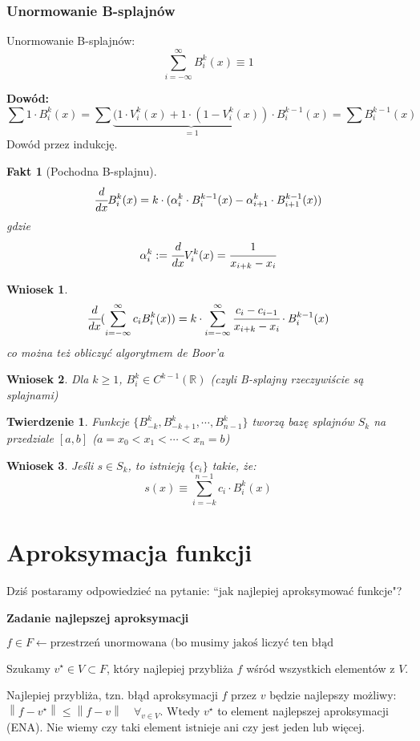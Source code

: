 \documentclass[hidelinks,a4paper,fleqn,oneside]{book}
\newcommand{\RR}{\mathbb{R}}
\newcommand{\la}{\leftarrow}
\newcommand{\norm}[1]{\left\lVert#1\right\rVert}
\newtheorem{wniosek}{Wniosek}
\newtheorem{fakt}{Fakt}
\newtheorem{twierdz}{Twierdzenie}
\begin{document}
\subsubsection{Unormowanie B-splajnów}
Unormowanie B-splajnów: 
\[
	\sum_{i=-\infty}^{\infty} B_i^k(x) \equiv 1
\]

\textbf{Dowód:}
\[
\sum 1 \cdot B_i^k(x) = \sum \underbrace{(1 \cdot V_i^k(x) + 1 \cdot (1-V_i^k(x))}_{=1} \cdot B_i^{k-1}(x) = \sum B_i^{k-1}(x)
\]
Dowód przez indukcję.

\begin{fakt}[Pochodna B-splajnu]
	\[
		\cfrac{d}{dx} B_i^k(x) = k \cdot (\alpha_i^k \cdot B_i^{k-1}(x) - \alpha_{i+1}^k \cdot B_{i+1}^{k-1}(x))
	\]
	gdzie
	\[
		\alpha_i^k := \cfrac{d}{dx}V_i^k(x) = \cfrac{1}{x_{i+k} - x_i}
	\]
\end{fakt}
\begin{wniosek}
	\[
		\cfrac{d}{dx}(\sum_{i=-\infty}^{\infty} c_i B_i^k(x)) = k \cdot \sum_{i=-\infty}^{\infty} \cfrac{c_i - c_{i-1}}{x_{i+k}-x_i} \cdot B_i^{k-1}(x)
	\]
	co można też obliczyć algorytmem de Boor'a
\end{wniosek}
\begin{wniosek}
	Dla $k \geq 1$, $B_i^k \in C^{k-1}(\RR)$ (czyli B-splajny rzeczywiście są splajnami)
\end{wniosek}

\begin{twierdz}
	Funkcje $\{B_{-k}^k, B_{-k+1}^k, \cdots, B_{n-1}^{k}\}$ tworzą bazę splajnów $S_k$ na przedziale $[a, b]$ ($a = x_0 < x_1 < \cdots < x_n = b$)
\end{twierdz}
\begin{wniosek}
	Jeśli $s \in S_k$, to istnieją $\{c_i\}$ takie, że:
	\[
		s(x) \equiv \sum_{i=-k}^{n-1} c_i \cdot B_i^k(x)
	\]
\end{wniosek}

\section{Aproksymacja funkcji}
Dziś postaramy odpowiedzieć na pytanie: ``jak najlepiej aproksymować funkcje"?

\textbf{Zadanie najlepszej aproksymacji}

$f \in F \la \textrm{przestrzeń unormowana (bo musimy jakoś liczyć ten błąd}$

Szukamy $v^\star \in V \subset F$, który najlepiej przybliża $f$ wśród wszystkich elementów z $V$.

Najlepiej przybliża, tzn. błąd aproksymacji $f$ przez $v$ będzie najlepszy możliwy: $\norm{f-v^\star} \leq \norm{f-v} \quad \forall_{v \in V}$. Wtedy $v^\star$ to element najlepszej aproksymacji (ENA). Nie wiemy czy taki element istnieje ani czy jest jeden lub więcej.
\end{document}
